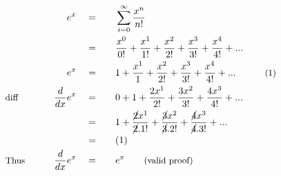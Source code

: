\begin{alignat*}{5}
&\,&e^x\quad&=\quad&&\sum_{i=0}^\infty\frac{x^n}{n!}\\
&\,&\,&=&&\frac{x^0}{0!}+\frac{x^1}{1!}+\frac{x^2}{2!}+\frac{x^3}{3!}+\frac{x^4}{4!}+...\\
&\,&e^x\quad&=&&1+\frac{x^1}{1}+\frac{x^2}{2!}+\frac{x^3}{3!}+\frac{x^4}{4!}+...\qquad&\small\text{(1)}\\
&\small\text{diff}&\frac{d}{dx}e^x\quad&=&&0+1+\frac{2x^1}{2!}+\frac{3x^2}{3!}+\frac{4x^3}{4!}+...\\
&\,&\,&=&&1+\frac{\cancel{2}x^1}{\cancel{2}.1!}+\frac{\cancel{3}x^2}{\cancel{3}.2!}+\frac{\cancel{4}x^3}{\cancel{4}.3!}+...\\
&\,&\,&=&&(1)\\
&\small\text{Thus}\normalsize\qquad&\frac{d}{dx}e^x\quad&=&&e^x\qquad\small\text{(valid proof)}
\end{alignat*}
